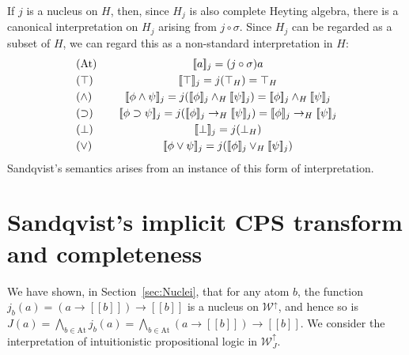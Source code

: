 \documentclass{sn-jnl}
\newcommand{\todo}[1]{\textcolor{red} {[todo: {#1}]}}
\newcommand{\At}{\text{At}}
\newcommand{\worlds}{\mathcal W}
\newcommand{\note}[1]{\textcolor{red} {[DP-Note: {#1}]}}
\newcommand{\db}[1]{[\![#1]\!]}
\begin{document}
If $j$ is a nucleus on $H$, then, since $H_j$ is also complete Heyting algebra, there is a canonical interpretation on $H_j$ arising from $j\circ \sigma$. Since $H_j$ can be regarded as a subset of $H$, we can regard this as a non-standard interpretation in $H$:
\[
\begin{array}{l@{\quad}@{\quad}c}%
(\mbox{At}) & \db{a}_j = (j \circ \sigma) a \\ [1mm]
(\top)      & \db{\top}_j = j(\top_H) = \top_H \\ [1mm]
(\wedge)    & \db{\phi\wedge\psi}_j =   
              j(\db{\phi}_j\wedge_H\db{\psi}_j) = \db{\phi}_j\wedge_H\db{\psi}_j \\ [1mm]
(\supset)   & \db{\phi\supset\psi}_j = j 
              (\db{\phi}_j\to_H\db{\psi}_j) = \db{\phi}_j\to_H\db{\psi}_j \\ [1mm]
(\bot)      & \db{\bot}_j = j (\bot_H) \\ [1mm]
(\vee)      & \db{\phi\vee\psi}_j = 
              j(\db{\phi}_j\vee_H\db{\psi}_j)
\end{array}
\]
Sandqvist's semantics arises from an instance of this form of interpretation. 

\section{Sandqvist's implicit CPS transform and completeness}\label{sec:Completeness2}

 We have shown, in Section~\ref{sec:Nuclei}, that for any atom $b$, the function $j_b (a) = (a\to \db{b})\to \db{b}$ is a nucleus on $\worlds^\uparrow$, 
and hence so is $J(a) = \bigwedge_{b\in\At} j_b(a) = \bigwedge_{b\in\At} (a\to \db{b})\to \db{b}$. We consider the interpretation of intuitionistic propositional logic in $\worlds^\uparrow_J$. 
\end{document}
